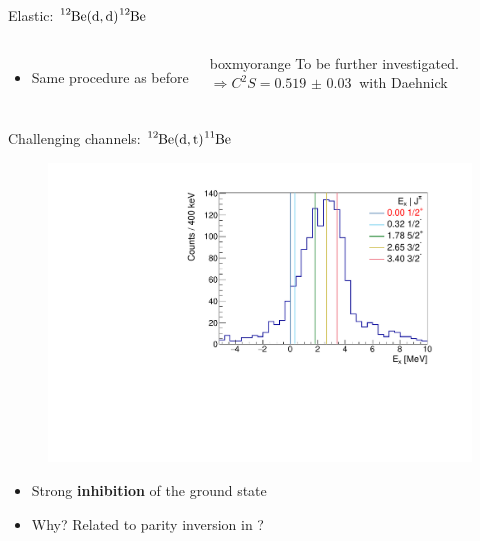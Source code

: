 \documentclass[sans,
frameno, %
mp,
usenames,dvipsnames, %
onlytextwidth, %
t,%
11pt]{beamer}
\newcommand{\iso}[2]{\ce{^{#1}#2}}
\begin{document}
\begin{frame}{Elastic: $\iso{12}{Be}(\textrm{d}, \textrm{d})\iso{12}{Be}$}
{\begin{figure}
\begin{minipage}[t]{0.48\linewidth}
            \end{minipage}
        \end{figure}
        \begin{columns}
            {
                \begin{itemize}
                    \item Same procedure as before
                \end{itemize}
            }\hfill
            {

                \begin{beamercolorbox}[sep=1ex, center, rounded=true]{boxmyorange}
                    To be further investigated. \\
                    $\Rightarrow C^2S = \qty{0.519(30)}{}$ with Daehnick
                \end{beamercolorbox}

            }
        \end{columns}
    }
\end{frame}

\begin{frame}{Challenging channels: $\iso{12}{Be}(\textrm{d}, \textrm{t})\iso{11}{Be}$}
    \begin{figure}
        \centering
        \includegraphics[width=0.6\linewidth]{figures/Workshop/12Be_dt_ex.pdf}
    \end{figure}
    \medskip
    \begin{itemize}
        \item Strong \textbf{inhibition} of the ground state
        \item Why? Related to parity inversion in \iso{11}{Be}?
    \end{itemize}
\end{frame}
\end{document}
